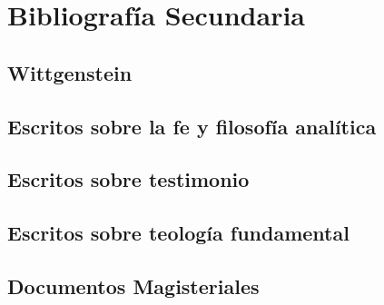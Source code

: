 \documentclass[11pt]{article}
\begin{document}
\nocite{lcateichref}
\nocite{philteichref}
\nocite{oncertref}
\printbibliography[heading=none,keyword=estudios]

\section{Bibliografía Secundaria}
\subsection{Wittgenstein}
\nocite{tractatusref}
\nocite{philinvref}
\nocite{oncertref}
\nocite{notebooksref}
\printbibliography[heading=none,keyword=witt]
\subsection{Escritos sobre la fe y filosofía analítica}
\nocite{antiseriref}
\nocite{cycref}
\printbibliography[heading=none,keyword=fefilo]
\subsection{Escritos sobre testimonio}
\nocite{testcoadyref}
\nocite{dicctfref}
\nocite{ftcpelliteroref}
\nocite{callaghanref}
\nocite{feylogicaconesaref}
\printbibliography[heading=none,keyword=testimonio]
\subsection{Escritos sobre teología fundamental}
\nocite{pradesmulticrref}
\nocite{CITFref}
\printbibliography[heading=none,keyword=tfund]

\subsection{Documentos Magisteriales}

\nocite{dvref}
\nocite{lgref}
\nocite{gsref}
\nocite{frref}
\nocite{PFref}
\nocite{EGref}
\nocite{ENPref}
\printbibliography[heading=none,keyword=mag]
\end{document}
